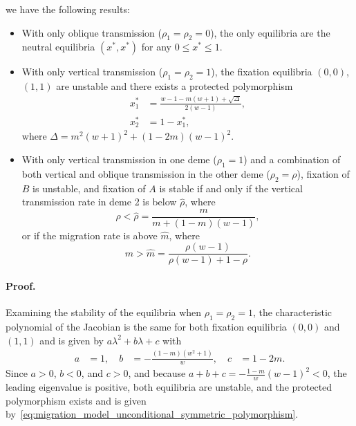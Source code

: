\documentclass[11pt]{extarticle}
\begin{document}
we have the following results:
\begin{itemize}
\item With only oblique transmission ($\rho_1=\rho_2=0$), the only equilibria are the neutral equilibria $(x^*,x^*)$ for any $0 \le x^* \le 1$.
\item With only vertical transmission ($\rho_1=\rho_2=1$), the fixation equilibria  $(0,0)$, $(1,1)$ are unstable and there exists a protected polymorphism
\begin{equation}
\begin{aligned} \label{eq:migration_model_unconditional_symmetric_polymorphism}
x_1^* &= \frac{w-1-m(w+1) + \sqrt{\Delta}}{2(w-1)}, \\
x_2^* &= 1-x_1^*,
\end{aligned}
\end{equation}
where $\Delta = m^2(w+1)^2+(1-2m)(w-1)^2$.
\item With only vertical transmission in one deme ($\rho_1=1$) and a combination of both vertical and oblique transmission in the other deme ($\rho_2=\rho$), fixation of $B$ is unstable, and fixation of $A$ is stable if and only if the vertical transmission rate in deme 2 is below $\hat \rho$, where
\begin{equation} \label{eq:migration_model_unconditional_symmetric_condition_rho}
\rho < \hat \rho = \frac{m}{m+(1-m)(w-1)},
\end{equation}
or if the migration rate is above $\hat m$, where
\begin{equation} \label{eq:migration_model_unconditional_symmetric_condition_m}
m > \hat m = \frac{\rho (w-1)}{\rho (w-1) +1-\rho}.
\end{equation}
\end{itemize}

\paragraph{Proof.}

Examining the stability of the equilibria when $\rho_1=\rho_2=1$, the characteristic polynomial of the Jacobian is the same for both fixation equilibria $(0,0)$ and $(1,1)$ and is given by $a \lambda^2 + b \lambda + c$ with
\begin{equation}
\begin{aligned}
a &= 1, \quad
b &= -\frac{(1-m)(w^2+1)}{w}, \quad
c &=  1-2m.
\end{aligned}
\end{equation}
Since $a>0$, $b<0$, and $c>0$, and because $a+b+c=-\frac{1-m}{w}(w-1)^2<0$, the leading eigenvalue is positive, both equilibria are unstable, and the protected polymorphism exists and is given by~\eqref{eq:migration_model_unconditional_symmetric_polymorphism}.
\end{document}
